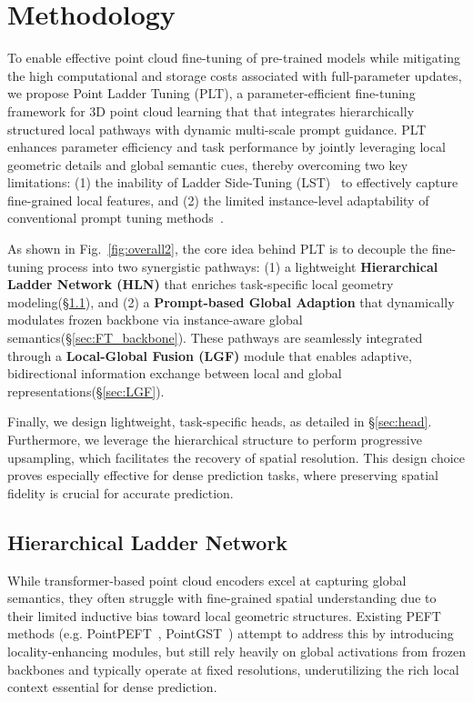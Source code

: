 


\section{Methodology}
\label{sec:methodology}

To enable effective point cloud fine-tuning of pre-trained models while mitigating the high computational and storage costs associated with full-parameter updates, we propose Point Ladder Tuning (PLT), a parameter-efficient fine-tuning framework for 3D point cloud learning that that integrates hierarchically structured local pathways with dynamic multi-scale prompt guidance. PLT enhances parameter efficiency and task performance by jointly leveraging local geometric details and global semantic cues, thereby overcoming two key limitations: (1) the inability of Ladder Side-Tuning (LST)~\cite{sung2022lst} to effectively capture fine-grained local features, and (2) the limited instance-level adaptability of conventional prompt tuning methods~\cite{li2021prefix}.

As shown in Fig.~\ref{fig:overall2}, the core idea behind PLT is to decouple the fine-tuning process into two synergistic pathways: (1) a lightweight \textbf{Hierarchical Ladder Network (HLN)} that enriches task-specific local geometry modeling(\S\ref{sec:HLN}), and (2) a \textbf{Prompt-based Global Adaption} that dynamically modulates frozen backbone via instance-aware global semantics(\S\ref{sec:FT_backbone}). These pathways are seamlessly integrated through a \textbf{Local-Global Fusion (LGF)} module that enables adaptive, bidirectional information exchange between local and global representations(\S\ref{sec:LGF}).

Finally, we design lightweight, task-specific heads, as detailed in \S\ref{sec:head}. Furthermore, we leverage the hierarchical structure to perform progressive upsampling, which facilitates the recovery of spatial resolution. This design choice proves especially effective for dense prediction tasks, where preserving spatial fidelity is crucial for accurate prediction.

\subsection{Hierarchical Ladder Network}
\label{sec:HLN}

While transformer-based point cloud encoders excel at capturing global semantics, they often struggle with fine-grained spatial understanding due to their limited inductive bias toward local geometric structures. Existing PEFT methods (e.g. PointPEFT~\cite{tang2024point}, PointGST~\cite{liang2024parameter}) attempt to address this by introducing locality-enhancing modules, but still rely heavily on global activations from frozen backbones and typically operate at fixed resolutions, underutilizing the rich local context essential for dense prediction.

